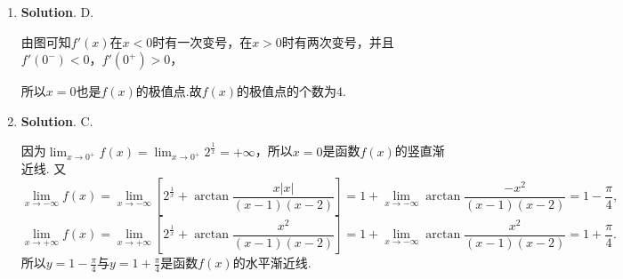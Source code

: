 \documentclass[../main.tex]{subfiles}
\begin{document}
\begin{enumerate}
          故$F'(0)=0$，即$F'(0)$存在.

          若$F(x)$在$x=0$处可导，则$\lim_{x\to0}\frac{F(x)-F(0)}{x}$存在，即$\lim_{x\to0}
              \frac{f(x)|\sin x|}{x}$存在.

          分别考察左右极限：
          \[
              \lim_{x\to0^+}\frac{f(x)|\sin x|}{x}=\lim_{x\to0^+}f(x)\frac{\sin x}{x}=f
              (0)\cdot 1 = f(0),
          \]
          \[
              \lim_{x\to0^-}\frac{f(x)|\sin x|}{x}=\lim_{x\to0^-}f(x)\frac{-\sin x}{x}=
              f(0)\cdot (-1) = -f(0).
          \]
          因为极限存在，左右极限必须相等，所以$f(0)=-f(0)$，解得$f(0)=0$.

          因此$f(0)=0$是$F'(0)$存在的充要条件.

    \item \textbf{Solution}. D.

          由图可知$f'(x)$在$x<0$时有一次变号，在$x>0$时有两次变号，并且$f'(0^{-})<0$，$f
              '(0^{+})>0$，

          所以$x=0$也是$f(x)$的极值点.故$f(x)$的极值点的个数为$4$.

    \item \textbf{Solution}. C.

          因为$\lim_{x\to0^+}f(x)=\lim_{x\to0^+}2^{\frac{1}{x}}=+\infty$，所以$x=0$是函数$f
              (x)$的竖直渐近线. 又
          \[
              \lim_{x\to-\infty}f(x)=\lim_{x\to-\infty}\left[2^{\frac{1}{x}}+\arctan\frac{x|x|}{(x-1)(x-2)}
                  \right]=1+\lim_{x\to-\infty}\arctan\frac{-x^{2}}{(x-1)(x-2)}=1-\frac{\pi}{4},
          \]
          \[
              \lim_{x\to+\infty}f(x)=\lim_{x\to+\infty}\left[2^{\frac{1}{x}}+\arctan\frac{x^{2}}{(x-1)(x-2)}
                  \right]=1+\lim_{x\to-\infty}\arctan\frac{x^{2}}{(x-1)(x-2)}=1+\frac{\pi}{4}.
          \]
          所以$y=1-\frac{\pi}{4}$与$y=1+\frac{\pi}{4}$是函数$f(x)$的水平渐近线.
\end{enumerate}
\end{document}
